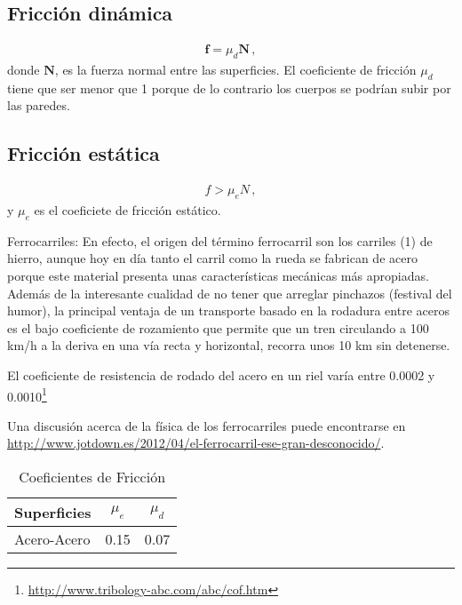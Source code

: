 \subsection{Fricci\'on din\'amica}
\begin{align}
  \mathbf{f}=\mu_d \mathbf{N}\,,
\end{align}
donde $\mathbf{N}$, es la fuerza normal entre las superficies. El coeficiente de fricción $\mu_d$ tiene que ser menor que 1 porque de lo contrario los cuerpos se podrían subir por las paredes. 

\subsection{Fricción estática}
\begin{align}
  f>\mu_e N\,,
\end{align}
y $\mu_e$ es el coeficiete de fricción estático.




\begin{frame}
  \begin{block}%
{Ferrocarriles:} En efecto, el origen del término ferrocarril son los carriles (1) de hierro, aunque hoy en día tanto el carril como la rueda se fabrican de acero porque este material presenta unas características mecánicas más apropiadas. Además de la interesante cualidad de no tener que arreglar pinchazos (festival del humor), la principal ventaja de un transporte basado en la rodadura entre aceros es el bajo coeficiente de rozamiento que permite que un tren circulando a 100 km/h a la deriva en una vía recta y horizontal, recorra unos 10 km sin detenerse. 
  \end{block}
El coeficiente de resistencia de rodado del acero en un riel varía entre 0.0002 y 0.0010\footnote{\url{http://www.tribology-abc.com/abc/cof.htm}} 
\end{frame}

Una discusión acerca de la física de los ferrocarriles puede encontrarse en \url{http://www.jotdown.es/2012/04/el-ferrocarril-ese-gran-desconocido/}.

\begin{table}
   \centering
   \begin{tabular}{|l|c|c|}\hline
    Superficies & $\mu_e$ & $\mu_d$\\\hline
     Acero-Acero & 0.15 & 0.07\\\hline
   \end{tabular}
  \caption{Coeficientes de Fricción}
   \label{tab:coeffric}
\end{table}



